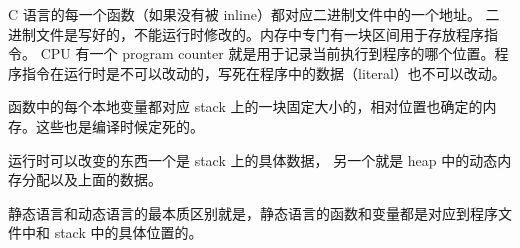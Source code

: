 
C 语言的每一个函数（如果没有被 inline）都对应二进制文件中的一个地址。 二进制文件是写好的，不能运行时修改的。内存中专门有一块区间用于存放程序指令。 CPU 有一个 program counter 就是用于记录当前执行到程序的哪个位置。程序指令在运行时是不可以改动的，写死在程序中的数据（literal）也不可以改动。

函数中的每个本地变量都对应 stack 上的一块固定大小的，相对位置也确定的内存。这些也是编译时候定死的。

运行时可以改变的东西一个是 stack 上的具体数据， 另一个就是 heap 中的动态内存分配以及上面的数据。

静态语言和动态语言的最本质区别就是，静态语言的函数和变量都是对应到程序文件中和 stack 中的具体位置的。


